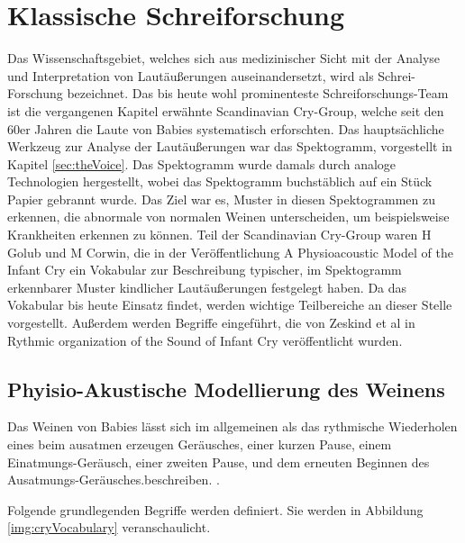 \section{Klassische Schreiforschung}

Das Wissenschaftsgebiet, welches sich aus medizinischer Sicht mit der Analyse und Interpretation von Lautäußerungen auseinandersetzt, wird als \grqq Schrei-Forschung\glqq{} bezeichnet. Das bis heute wohl prominenteste Schreiforschungs-Team ist die vergangenen Kapitel erwähnte \glqq Scandinavian Cry-Group\grqq \cite{crygroup}, welche seit den 60er Jahren die Laute von Babies systematisch erforschten. Das hauptsächliche Werkzeug zur Analyse der Lautäußerungen war das Spektogramm, vorgestellt in Kapitel \ref{sec:theVoice}. Das Spektogramm wurde damals durch analoge Technologien hergestellt, wobei das Spektogramm buchstäblich auf ein Stück Papier gebrannt wurde.  Das Ziel war es, Muster  in diesen Spektogrammen zu erkennen, die abnormale von normalen Weinen unterscheiden, um beispielsweise Krankheiten erkennen zu können. \cite[S. 142]{signal} Teil der Scandinavian Cry-Group waren H Golub und M Corwin, die in der Veröffentlichung \glqq A Physioacoustic Model of the Infant Cry \grqq{} \cite{cryModel} ein Vokabular zur Beschreibung typischer, im Spektogramm erkennbarer Muster kindlicher Lautäußerungen festgelegt haben. Da das Vokabular bis heute Einsatz findet, werden wichtige Teilbereiche an dieser Stelle vorgestellt. Außerdem werden Begriffe eingeführt, die von Zeskind et al in \glqq Rythmic organization of the Sound of Infant Cry \grqq{} veröffentlicht wurden.\cite{rythmic}

\subsection{Phyisio-Akustische Modellierung des Weinens}
\label{sec:acousticModel}

Das Weinen von Babies lässt sich im allgemeinen als das \glqq rythmische Wiederholen eines beim ausatmen erzeugen Geräusches, einer kurzen Pause, einem Einatmungs-Geräusch, einer zweiten Pause, und dem erneuten Beginnen des Ausatmungs-Geräusches.\grqq beschreiben. \cite{wolff}.

Folgende grundlegenden Begriffe werden definiert. Sie werden in Abbildung \ref{img:cryVocabulary} veranschaulicht.

